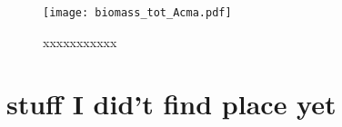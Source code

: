 \documentclass{article}
\begin{document}
	
	
	
	
	\begin{figure}
		\centering
		\texttt{[image: biomass\_tot\_Acma.pdf]} 
		\caption{xxxxxxxxxxx}
		\label{fig:fig_1xxx}
	\end{figure}
	
	
	
	\section*{stuff I did't find place yet}
	
	
	\newpage
	
	
	
	
	
	
	
	
	
	
\end{document}
